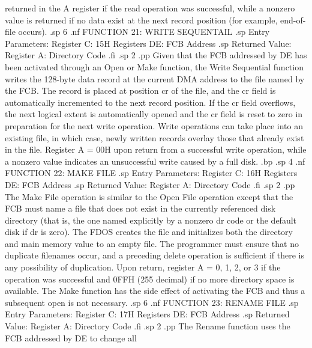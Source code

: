 returned in the A register if the read operation was successful, 
while a nonzero value is returned if no data exist at the next 
record position (for example, end-of-file occurs).
.sp 6
.nf
                 FUNCTION 21:  WRITE SEQUENTAIL
.sp
               Entry Parameters:
                     Register C:  15H
                   Registers DE:  FCB Address
.sp
               Returned Value:
                    Register  A:  Directory Code
.fi
.sp 2
.pp
Given that the FCB addressed by DE has been activated through an 
Open or Make function, the Write Sequential 
function writes the 128-byte data record at the current DMA 
address to the file named by the FCB.  The record is placed at 
position cr of the file, and the cr field is automatically 
incremented to the next record position.  If the cr field 
overflows, the next logical extent is automatically opened and 
the cr field is reset to zero in preparation for the next write 
operation.  Write operations can take place into an existing 
file, in which case, newly written records overlay those that 
already exist in the file.  Register A = 00H upon return from a 
successful write operation, while a nonzero value indicates an 
unsuccessful write caused by a full disk.
.bp
.sp 4
.nf
                     FUNCTION 22:  MAKE FILE
.sp
                 Entry Parameters:
                       Register C:  16H
                     Registers DE:  FCB Address
.sp
                 Returned Value:
                      Register  A:  Directory Code
.fi
.sp 2
.pp
The Make File operation is similar to the Open File operation 
except that the FCB must name a file that does not exist in the 
currently referenced disk directory (that is, the one named 
explicitly by a nonzero dr code or the default disk if dr is 
zero).  The FDOS creates the file and initializes both the 
directory and main memory value to an empty file.  The programmer 
must ensure that no duplicate filenames occur, and a preceding 
delete operation is sufficient if there is any possibility of 
duplication.  Upon return, register A = 0, 1, 2, or 3 if the 
operation was successful and 0FFH (255 decimal) if no more 
directory space is available.  The Make function has the side 
effect of activating the FCB and thus a subsequent open is not 
necessary.
.sp 6
.nf
                    FUNCTION 23:  RENAME FILE
.sp
                Entry Parameters:
                      Register C:  17H
                    Registers DE:  FCB Address
.sp
                Returned Value:
                     Register  A:  Directory Code
.fi
.sp 2
.pp
The Rename function uses the FCB addressed by DE to change all 
